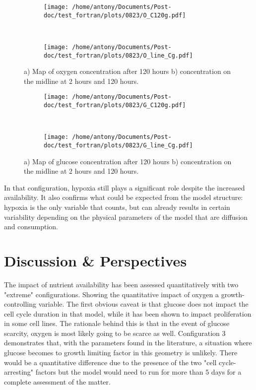 \documentclass[11pt,a4paper]{article}
\begin{document}
\begin{figure}[ht!]
	\begin{subfigure}{0.5\textwidth}
	\centering
	\texttt{[image: /home/antony/Documents/Post-doc/test\_fortran/plots/0823/O\_C120g.pdf]}
	\caption{ \label{O_C120}}
	\end{subfigure}
	~~
	\begin{subfigure}{0.4\textwidth}
	\texttt{[image: /home/antony/Documents/Post-doc/test\_fortran/plots/0823/O\_line\_Cg.pdf]}
		\caption{ \label{O_line_C}}
	\end{subfigure}
	\caption{a) Map of oxygen concentration after 120 hours b) concentration on the midline at 2 hours and 120 hours.\label{O_C}}
	\end{figure}	
	
	\begin{figure}[ht!]
	\begin{subfigure}{0.5\textwidth}
	\centering
	\texttt{[image: /home/antony/Documents/Post-doc/test\_fortran/plots/0823/G\_C120g.pdf]}
	\caption{ \label{G_C120}}
	\end{subfigure}
	~~
	\begin{subfigure}{0.4\textwidth}
	\texttt{[image: /home/antony/Documents/Post-doc/test\_fortran/plots/0823/G\_line\_Cg.pdf]}
		\caption{ \label{G_line_C}}
	\end{subfigure}
	\caption{a) Map of glucose concentration after 120 hours b) concentration on the midline at 2 hours and 120 hours.\label{G_C}}
	\end{figure}	

In that configuration, hypoxia still plays a significant role despite the increased availability. It also confirms what could be expected from the model structure: hypoxia is the only variable that counts, but can already results in certain variability depending on the physical parameters of the model that are diffusion and consumption. 

\newpage
\section{Discussion \& Perspectives}	
The impact of nutrient availability has been assessed quantitatively with two "extreme" configurations. Showing the quantitative impact of oxygen a growth-controlling variable. The first obvious caveat is that glucose does not impact the cell cycle duration in that model, while it has been shown to impact proliferation in some cell lines.\cite{Han2011} The rationale behind this is that in the event of glucose scarcity, oxygen is most likely going to be scarce as well. Configuration 3 demonstrates that, with the parameters found in the literature, a situation where glucose becomes to growth limiting  factor in this geometry is unlikely. There would be a quantitative difference due to the presence of the two "cell cycle-arresting" factors but the model would need to run for more than 5 days for a complete assessment of the matter.\\
\end{document}
